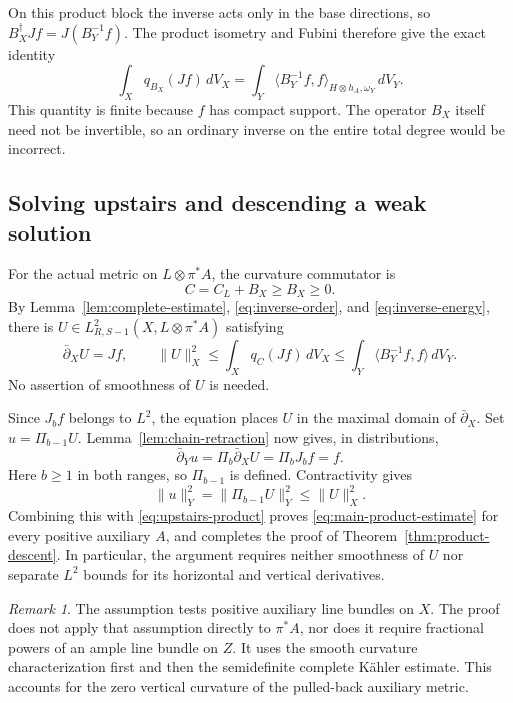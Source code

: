 \documentclass[11pt,reqno]{amsart}
\numberwithin{equation}{section}
\theoremstyle{definition}
\theoremstyle{remark}
\newtheorem{remark}[theorem]{Remark}
\newcommand{\db}{\bar\partial}
\newcommand{\ip}[2]{\langle #1,#2\rangle}
\begin{document}
On this product block the inverse acts only in the base directions, so $B_X^\dagger Jf=J(B_Y^{-1}f)$. The product isometry and Fubini therefore give the exact identity
\begin{equation}\label{eq:inverse-energy}
 \int_X q_{B_X}(Jf)\,dV_X
   =\int_Y\ip{B_Y^{-1}f}{f}_{H\otimes h_A,\omega_Y}\,dV_Y.
\end{equation}
This quantity is finite because $f$ has compact support. The operator $B_X$ itself need not be invertible, so an ordinary inverse on the entire total degree would be incorrect.

\subsection{Solving upstairs and descending a weak solution}
For the actual metric on $L\otimes\pi^*A$, the curvature commutator is
\[
 C=C_L+B_X\geq B_X\geq0.
\]
By Lemma~\ref{lem:complete-estimate}, \eqref{eq:inverse-order}, and \eqref{eq:inverse-energy}, there is
$U\in L^2_{R,S-1}(X,L\otimes\pi^*A)$ satisfying
\begin{equation}\label{eq:upstairs-product}
 \db_XU=Jf,\qquad
 \|U\|_X^2\leq\int_Xq_C(Jf)\,dV_X
       \leq\int_Y\ip{B_Y^{-1}f}{f}\,dV_Y.
\end{equation}
No assertion of smoothness of $U$ is needed.

Since $J_bf$ belongs to $L^2$, the equation places $U$ in the maximal domain of $\db_X$. Set $u=\Pi_{b-1}U$. Lemma~\ref{lem:chain-retraction} now gives, in distributions,
\[
 \db_Yu=\Pi_b\db_XU=\Pi_bJ_bf=f.
\]
Here $b\geq1$ in both ranges, so $\Pi_{b-1}$ is defined. Contractivity gives
\begin{equation}\label{eq:descent-contraction}
 \|u\|_Y^2=\|\Pi_{b-1}U\|_Y^2\leq\|U\|_X^2.
\end{equation}
Combining this with \eqref{eq:upstairs-product} proves \eqref{eq:main-product-estimate} for every positive auxiliary $A$, and completes the proof of Theorem~\ref{thm:product-descent}. In particular, the argument requires neither smoothness of $U$ nor separate $L^2$ bounds for its horizontal and vertical derivatives.

\begin{remark}
The assumption tests positive auxiliary line bundles on $X$. The proof does not apply that assumption directly to $\pi^*A$, nor does it require fractional powers of an ample line bundle on $Z$. It uses the smooth curvature characterization first and then the semidefinite complete K\"ahler estimate. This accounts for the zero vertical curvature of the pulled-back auxiliary metric.
\end{remark}
\end{document}
